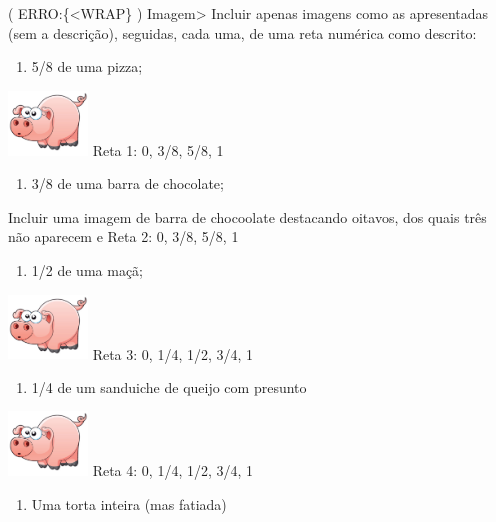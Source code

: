 \documentclass[a4,12pt]{book}
\begin{document}
( ERRO:\{<WRAP\} ) Imagem>
Incluir apenas imagens como as apresentadas (sem a descrição), seguidas, cada uma, de uma reta numérica como descrito:

\begin{enumerate} [\quad a)] %
  \item     5/8 de uma pizza;
\end{enumerate} %

\includegraphics[width=60pt, keepaspectratio]{pig}
Reta 1: 0, 3/8, 5/8, 1

\begin{enumerate} [\quad a)] %
  \item     3/8 de uma barra de chocolate;
\end{enumerate} %

Incluir uma imagem de barra de chocoolate destacando oitavos, dos quais três não aparecem e
Reta 2: 0, 3/8, 5/8, 1

\begin{enumerate} [\quad a)] %
  \item     1/2 de uma maçã;
\end{enumerate} %

\includegraphics[width=60pt, keepaspectratio]{pig}
Reta 3: 0, 1/4, 1/2, 3/4, 1

\begin{enumerate} [\quad a)] %
  \item     1/4 de um  sanduiche de queijo com presunto
\end{enumerate} %

\includegraphics[width=60pt, keepaspectratio]{pig}
Reta 4: 0, 1/4, 1/2, 3/4, 1

\begin{enumerate} [\quad a)] %
  \item     Uma  torta inteira (mas fatiada)
\end{enumerate} %
\end{document}
